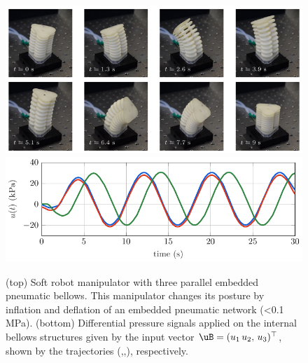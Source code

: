 \begin{figure}[!h]
 \centering
 \includegraphics*[width=\textwidth]{./pdf/thesis-figure-4-1-1.pdf} \\[1.25em]
 \includegraphics*[width=\textwidth]{./pdf/thesis-figure-4-1-2.pdf}
%
  \caption{(top) Soft robot manipulator with three parallel embedded pneumatic bellows. This manipulator changes its posture by inflation and deflation of an embedded pneumatic network (<0.1 \si{\mega \pascal}). (bottom) Differential pressure signals applied on the internal bellows structures given by the input vector $\uB = (u_1\,u_2,\,u_3)^\top$, shown by the trajectories (,,), respectively.}
  \vspace{-0.1cm}
  \label{fig:C2:soft_robot}
\end{figure}

